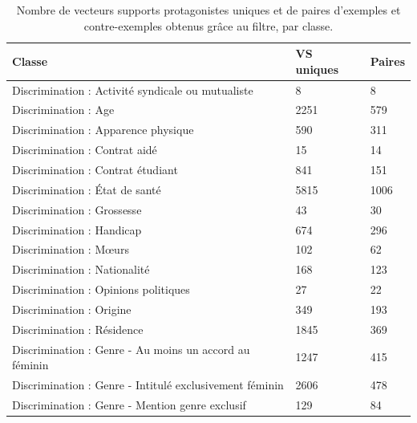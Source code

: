 \begin{table}
    \caption{Nombre de vecteurs supports protagonistes uniques et de paires d'exemples et contre-exemples obtenus grâce au filtre, par classe. } \label{tab:nb_vs}
    \begin{tabular}{|p{}|p{}|p{}|}
        \hline
            \textbf{Classe}    & \textbf{VS uniques} & \textbf{Paires} \\ \hline
            Discrimination : Activité syndicale ou mutualiste      &     8  &  8      \\ \hline
            Discrimination : Age                                   &  2251  &  579    \\ \hline
            Discrimination : Apparence physique                    &   590  &  311    \\ \hline
            Discrimination : Contrat aidé                          &    15  &  14     \\ \hline
            Discrimination : Contrat étudiant                      &   841  &  151    \\ \hline
            Discrimination : \'Etat de santé                       &  5815  &  1006   \\ \hline
            Discrimination : Grossesse                             &    43  &  30     \\ \hline
            Discrimination : Handicap                              &   674  &  296    \\ \hline
            Discrimination : M\oe urs                              &   102  &  62     \\ \hline
            Discrimination : Nationalité                           &   168  &  123    \\ \hline
            Discrimination : Opinions politiques                   &    27  &  22     \\ \hline
            Discrimination : Origine                               &   349  &  193    \\ \hline
            Discrimination : Résidence                             &  1845  &  369    \\ \hline
            Discrimination : Genre - Au moins un accord au féminin &  1247  &  415    \\ \hline
            Discrimination : Genre - Intitulé exclusivement féminin &  2606  &  478   \\ \hline
            Discrimination : Genre - Mention genre exclusif        &   129  &  84     \\ \hline

\end{tabular}
\end{table}
